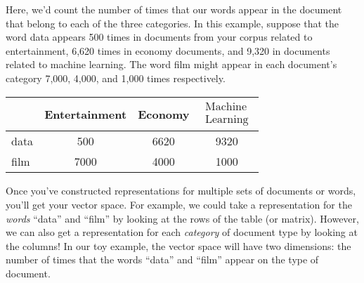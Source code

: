 \documentclass[12pt]{article}
\begin{document}
\begin{center}
\end{center}

Here, we'd count the number of times that our words appear in the document that belong to each of the three categories. In this example, suppose that the word data appears 500 times in documents from your corpus related to entertainment, 6,620 times in economy documents, and 9,320 in documents related to machine learning. The word film might appear in each document's category 7,000, 4,000, and 1,000 times respectively.

  \begin{table}[h]
    \begin{center}
      \begin{tabular}{l c c c}
        & Entertainment & Economy & $\substack{\textrm{Machine}\\ \textrm{Learning}}$ \\
        \hline
        data & 500 & 6620 & 9320 \\
        film & 7000 & 4000 & 1000 \\
        \hline
      \end{tabular}
    \end{center}
  \end{table}

Once you've constructed representations for multiple sets of documents or words, you'll get your vector space. For example, we could take a representation for the \emph{words} ``data'' and ``film'' by looking at the rows of the table (or matrix). However, we can also get a representation for each \emph{category} of document type by looking at the columns! In our toy example, the vector space will have two dimensions: the number of times that the words ``data'' and ``film'' appear on the type of document.
\end{document}
